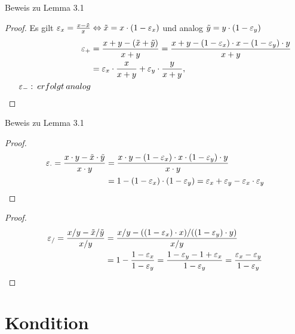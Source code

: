 \documentclass{beamer}
\begin{document}
  \begin{frame}{Beweis zu Lemma 3.1}
      \begin{proof}
        Es gilt 
        $\varepsilon_x = \frac{x- \Tilde{x}}{x} \Leftrightarrow \Tilde{x}=x \cdot(1- \varepsilon_x)$ und analog $\Tilde{y}=y \cdot(1-\varepsilon_y)$ 
        \begin{align*}
        \varepsilon_+&= \frac{x+y-(\Tilde{x}+\Tilde{y})}{x+y}= \frac{x+y-(1-\varepsilon_x)\cdot x- (1-\varepsilon_y) \cdot y}{x+y} \\
        &= \varepsilon_x \cdot \frac{x}{x+y}+ \varepsilon_y \cdot \frac{y}{x+y}, \\
         \varepsilon_-: \: erfolgt \: analog
        \end{align*}
        \end{proof}
    \end{frame}
    \begin{frame}{Beweis zu Lemma 3.1}
       \begin{proof}
         \begin{align*} 
          \varepsilon_{\cdot}= \frac{x \cdot y- \Tilde{x}\cdot \Tilde{y}}{x \cdot y} &= \frac{x \cdot y-(1- \varepsilon_x)\cdot x \cdot (1- \varepsilon_y) \cdot y}{x \cdot y} \\ 
          & = 1- (1- \varepsilon_x) \cdot (1- \varepsilon_y)= \varepsilon_x+ \varepsilon_y - \varepsilon_x \cdot \varepsilon_y
        \end{align*}
      \end{proof}
    \end{frame}

    \begin{frame}
      \begin{proof}
        \begin{align*}
        \varepsilon_/= \frac{x/y- \Tilde{x}/ \Tilde{y}}{x/y} &= \frac{x/y- ((1- \varepsilon_x) \cdot x)/((1- \varepsilon_y) \cdot y)}{x/y} \\
        &= 1- \frac{1- \varepsilon_x}{1- \varepsilon_y}= \frac{1- \varepsilon_y- 1+ \varepsilon_x}{1- \varepsilon_y}= \frac{\varepsilon_x-\varepsilon_y}{1-\varepsilon_y}
        \end{align*}
       \end{proof} 
    \end{frame} 
      
  

 \section{Kondition} 
\end{document}
